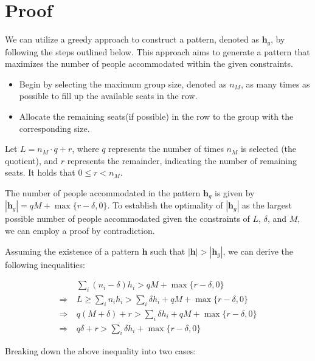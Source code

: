 \clearpage
\section*{Proof}

\begin{pf}
We can utilize a greedy approach to construct a pattern, denoted as $\bm{h}_{g}$, by following the steps outlined below. This approach aims to generate a pattern that maximizes the number of people accommodated within the given constraints.

\begin{itemize}
 \item Begin by selecting the maximum group size, denoted as $n_M$, as many times as possible to fill up the available seats in the row.
 \item Allocate the remaining seats(if possible) in the row to the group with the corresponding size.
\end{itemize}

Let $L = n_M \cdot q + r$, where $q$ represents the number of times $n_M$ is selected (the quotient), and $r$ represents the remainder, indicating the number of remaining seats. It holds that $0 \leq r < n_M$. 

The number of people accommodated in the pattern $\bm{h}_{g}$ is given by $|\bm{h}_{g}| = q M + \max\{r-\delta, 0\}$. To establish the optimality of $|\bm{h}_{g}|$ as the largest possible number of people accommodated given the constraints of $L$, $\delta$, and $M$, we can employ a proof by contradiction.


Assuming the existence of a pattern $\bm{h}$ such that $|\bm{h}| > |\bm{h}_{g}|$, we can derive the following inequalities: 

\begin{align*}
  & \sum_{i} (n_i - \delta) h_i > q M + \max\{r-\delta, 0\} \\
  \Rightarrow ~& L \geq \sum_{i} n_i h_i > \sum_{i} \delta h_i + q M + \max\{r-\delta, 0\} \\
  \Rightarrow ~& q(M + \delta) + r > \sum_{i} \delta h_i + q M + \max\{r-\delta, 0\} \\
  \Rightarrow ~& q \delta + r > \sum_{i} \delta h_i + \max\{r-\delta, 0\}
\end{align*}

Breaking down the above inequality into two cases:



\end{pf}
